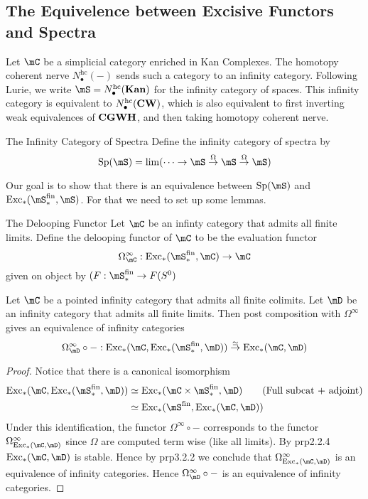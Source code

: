 \documentclass[a4paper]{article}
\begin{document}
\subsection{The Equivelence between Excisive Functors and Spectra}
Let $\mC$ be a simplicial category enriched in Kan Complexes. The homotopy coherent nerve $N_\bullet^\text{hc}(-)$ sends such a category to an infinity category. Following Lurie, we write $\mS=N_\bullet^{\text{hc}}(\bold{Kan})$ for the infinity category of spaces. This infinity category is equivalent to $N_\bullet^\text{hc}(\bold{CW})$, which is also equivalent to first inverting weak equivalences of $\bold{CGWH}$, and then taking homotopy coherent nerve. 

\begin{defn}{The Infinity Category of Spectra}{} Define the infinity category of spectra by $$\text{Sp}(\mS)=\lim(\cdots\rightarrow\mS\overset{\Omega}{\rightarrow}\mS\overset{\Omega}{\rightarrow}\mS)$$
\end{defn}

Our goal is to show that there is an equivalence between $\text{Sp}(\mS)$ and $\text{Exc}_\ast(\mS_\ast^\text{fin},\mS)$. For that we need to set up some lemmas. 

\begin{defn}{The Delooping Functor}{} Let $\mC$ be an infinty category that admits all finite limits. Define the delooping functor of $\mC$ to be the evaluation functor $$\Omega_\mC^\infty:\text{Exc}_\ast(\mS_\ast^\text{fin},\mC)\to\mC$$ given on object by $(F:\mS_\ast^\text{fin}\to F(S^0)$
\end{defn}

\begin{prp}{}{} Let $\mC$ be a pointed infinity category that admits all finite colimits. Let $\mD$ be an infinity category that admits all finite limits. Then post composition with $\Omega^\infty$ gives an equivalence of infinity categories $$\Omega_\mD^\infty\circ-:\text{Exc}_\ast(\mC,\text{Exc}_\ast(\mS_\ast^\text{fin},\mD))\overset{\simeq}{\rightarrow}\text{Exc}_\ast(\mC,\mD)$$ \tcbline
\begin{proof}
Notice that there is a canonical isomorphism 
\begin{align*}
\text{Exc}_\ast(\mC,\text{Exc}_\ast(\mS_\ast^\text{fin},\mD))&\simeq\text{Exc}_\ast(\mC\times\mS_\ast^\text{fin},\mD)\tag{Full subcat + adjoint}\\
&\simeq\text{Exc}_\ast(\mS^\text{fin},\text{Exc}_\ast(\mC,\mD))
\end{align*}
Under this identification, the functor $\Omega^\infty\circ -$ corresponds to the functor $\Omega_{\text{Exc}_\ast(\mC,\mD)}^\infty$ since $\Omega$ are computed term wise (like all limits). By prp2.2.4 $\text{Exc}_\ast(\mC,\mD)$ is stable. Hence by prp3.2.2 we conclude that $\Omega_{\text{Exc}_\ast(\mC,\mD)}^\infty$ is an equivalence of infinity categories. Hence $\Omega_\mD^\infty\circ-$ is an equivalence of infinity categories. 
\end{proof}
\end{prp}
\end{document}
